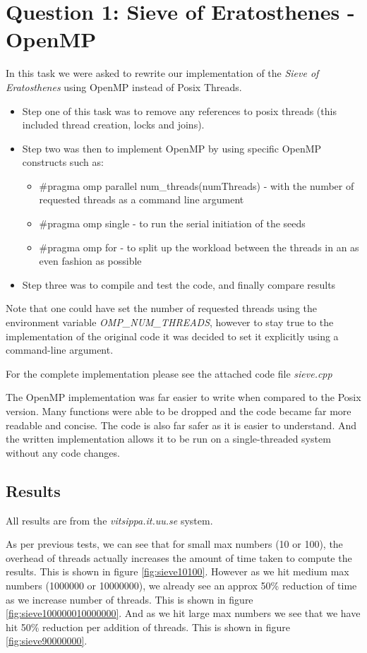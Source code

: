 \section{Question 1: Sieve of Eratosthenes - OpenMP}

In this task we were asked to rewrite our implementation of the \textit{Sieve of Eratosthenes} using OpenMP instead of Posix Threads. 
\begin{itemize}
  \item Step one of this task was to remove any references to posix threads (this included thread creation, locks and joins). 
  \item Step two was then to implement OpenMP by using specific OpenMP constructs such as:
  \begin{itemize}
    \item \#pragma omp parallel num\_threads(numThreads) - with the number of requested threads as a command line argument 
    \item \#pragma omp single - to run the serial initiation of the seeds 
    \item \#pragma omp for - to split up the workload between the threads in an as even fashion as possible
  \end{itemize}
  \item Step three was to compile and test the code, and finally compare results 
\end{itemize}
Note that one could have set the number of requested threads using the environment variable \textit{OMP\_NUM\_THREADS}, 
however to stay true to the implementation of the original code it was decided to set it explicitly using a command-line argument.

For the complete implementation please see the attached code file \textit{sieve.cpp}

The OpenMP implementation was far easier to write when compared to the Posix version. 
Many functions were able to be dropped and the code became far more readable and concise.
The code is also far safer as it is easier to understand. And the written implementation allows it to be run on a single-threaded system without any code changes. 

\subsection{Results}
All results are from the \textit{vitsippa.it.uu.se} system.

As per previous tests, we can see that for small max numbers (10 or 100), the overhead of threads actually increases the amount of time taken to compute the results.
This is shown in figure \ref{fig:sieve10100}. However as we hit medium max numbers (1000000 or 10000000), we already see an approx 50\% reduction of time as we increase number of threads.
This is shown in figure \ref{fig:sieve100000010000000}. 
And as we hit large max numbers we see that we have hit 50\% reduction per addition of threads.
This is shown in figure \ref{fig:sieve90000000}.

